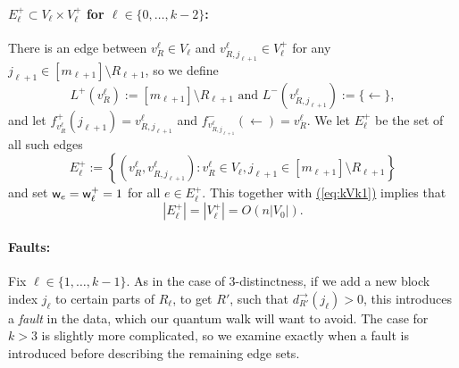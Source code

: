 \documentclass{theoretics}
\newcommand{\eq}[1]{\hyperref[eq:#1]{(\ref*{eq:#1})}}
\renewcommand{\>}{\rangle}
\newcommand{\<}{\langle}
\renewcommand{\(}{\left(}
\renewcommand{\)}{\right)}
\def\abs#1{\left| #1 \right|}
\def\w{{\sf w}}
\begin{document}
\paragraph{$E_{\ell}^+\subset V_{\ell}\times V_{\ell}^+$ for $\ell \in \{0,\dots,k-2\}$:} There is an edge between $v^{\ell}_{R}\in V_{\ell}$ and $v^{\ell}_{R,j_{\ell+1}} \in V_{\ell}^+$ for any $j_{\ell+1}\in [m_{\ell+1}]\setminus R_{\ell+1}$, so we define
$$L^+(v^{\ell}_R):=[m_{\ell+1}]\setminus R_{\ell+1}
\mbox{ and }
L^-(v^{\ell}_{R,j_{\ell+1}}):=\{\leftarrow\},$$
and let $f^+_{v_R^{\ell}}(j_{\ell+1})=v_{R,j_{\ell+1}}^{\ell}$ and $f^-_{v_{R,j_{\ell+1}}^{\ell}}(\leftarrow)=v^{\ell}_R$. We let $E_{\ell}^+$ be the set of all such edges
$$E_{\ell}^{+}:=\left\{(v^{\ell}_{R},v^{\ell}_{R,j_{\ell+1}}):v^{\ell}_{R}\in V_{\ell}, j_{\ell+1}\in [m_{\ell+1}]\setminus R_{\ell+1}\right\}$$
and set $\w_e=\w_{\ell}^+=1$ for all $e\in E_{\ell}^+$.
This together with \eq{kVk1} implies that 
\begin{equation}
	\abs{E_{\ell}^+} = \abs{V_{\ell}^+} = O\left(n\abs{V_0}\right).\label{eq:kEk0}
\end{equation}



\paragraph{Faults:} Fix $\ell\in\{1,\dots,k-1\}$. As in the case of 3-distinctness, if we add a new block index $j_{\ell}$ to certain parts of $R_{\ell}$, to get $R'$, such that $d_{R'}^{\rightarrow}(j_{\ell})>0$, this introduces a \emph{fault} in the data, which our quantum walk will want to avoid. The case for $k>3$ is slightly more complicated, so we examine exactly when a fault is introduced before describing the remaining edge sets. 
\end{document}
